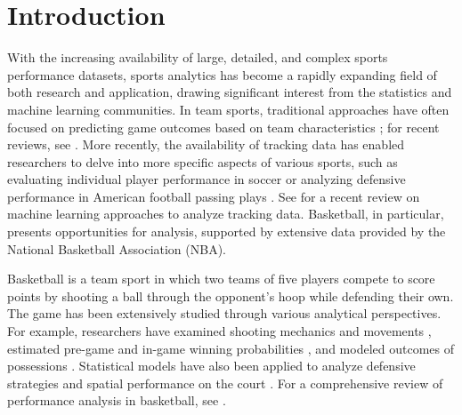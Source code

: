 \section{Introduction} %
\label{sec:introduction}


With the increasing availability of large, detailed, and complex sports performance datasets, sports analytics has become a rapidly expanding field of both research and application, drawing significant interest from the statistics and machine learning communities. In team sports, traditional approaches have often focused on predicting game outcomes based on team characteristics \citep{dixonModellingAssociationFootball1997,babootaPredictiveAnalysisModelling2019}; for recent reviews, see \cite{horvatUseMachineLearning2020,bunkerApplicationMachineLearning2022}.
More recently, the availability of tracking data has enabled researchers to delve into more specific aspects of various sports, such as evaluating individual player performance in soccer \citep{pappalardoPlayeRankDatadrivenPerformance2019,decroosActionsSpeakLouder2019} or analyzing defensive performance in American football passing plays \citep{schmidSimulatingDefensiveTrajectories2021}. See \cite{kovalchikPlayerTrackingData2023} for a recent review on machine learning approaches to analyze tracking data. Basketball, in particular, presents opportunities for analysis, supported by extensive data provided by the National Basketball Association (NBA).


Basketball is a team sport in which two teams of five players compete to score points by shooting a ball through the opponent's hoop while defending their own. The game has been extensively studied through various analytical perspectives. For example, researchers have examined shooting mechanics and movements \citep{millerRelationshipBasketballShooting1996,liuChangesBasketballShooting1999,okazakiReviewBasketballJump2015}, estimated pre-game and in-game winning probabilities \citep{maddoxBayesianEstimationIngame2022}, and modeled outcomes of possessions \citep{cervoneMultiresolutionStochasticProcess2016}. Statistical models have also been applied to analyze defensive strategies \citep{csataljayEffectsDefensivePressure2013} and spatial performance on the court \citep{zuccolottoSpatialPerformanceAnalysis2023}. For a comprehensive review of performance analysis in basketball, see \cite{ternerModelingPlayerTeam2021}.


